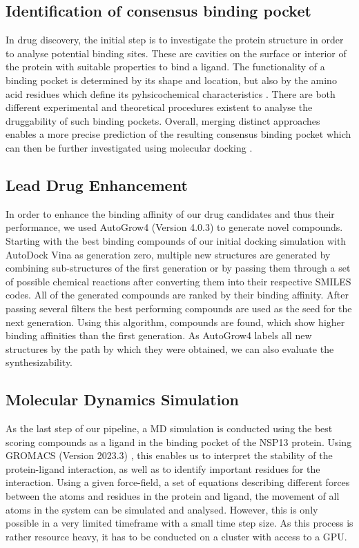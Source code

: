 \documentclass[11pt, letterpaper, titlepage]{article}
\renewcommand{\cite}{\parencite}
\begin{document}
\subsection{Identification of consensus binding pocket}
In drug discovery, the initial step is to investigate the protein structure in order to analyse potential binding sites. These are cavities on the surface or interior of the protein with suitable properties to bind a ligand. The functionality of a binding pocket is determined by its shape and location, but also by the amino acid residues which define its pyhsicochemical characteristics \cite{Stank_2016}. 
There are both different experimental and theoretical procedures existent to analyse the druggability of such binding pockets. Overall, merging distinct approaches enables a more precise prediction of the resulting consensus binding pocket which can then be further investigated using molecular docking \cite{Ricci_2022}. 

\subsection{Lead Drug Enhancement}
In order to enhance the binding affinity of our drug candidates and thus their performance, we used AutoGrow4 (Version 4.0.3) \cite{package_Autogrow4} to generate novel compounds. Starting with the best binding compounds of our initial docking simulation with AutoDock Vina as generation zero, multiple new structures are generated by combining sub-structures of the first generation or by passing them through a set of possible chemical reactions after converting them into their respective SMILES codes. All of the generated compounds are ranked by their binding affinity. After passing several filters the best performing compounds are used as the seed for the next generation. Using this algorithm, compounds are found, which show higher binding affinities than the first generation. As AutoGrow4 labels all new structures by the path by which they were obtained, we can also evaluate the synthesizability.  

\subsection{Molecular Dynamics Simulation}
As the last step of our pipeline, a MD simulation is conducted using the best scoring compounds as a ligand in the binding pocket of the NSP13 protein. Using GROMACS (Version 2023.3) \cite{package_GROMACS}, this enables us to interpret the stability of the protein-ligand interaction, as well as to identify important residues for the interaction. Using a given force-field, a set of equations describing different forces between the atoms and residues in the protein and ligand, the movement of all atoms in the system can be simulated and analysed. However, this is only possible in a very limited timeframe with a small time step size. As this process is rather resource heavy, it has to be conducted on a cluster with access to a GPU. 
\end{document}
